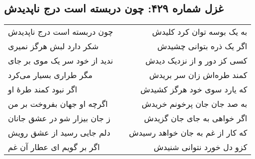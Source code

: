\begin{center}
\section*{غزل شماره ۴۲۹: چون دربسته است درج ناپدیدش}
\label{sec:429}
\begin{longtable}{l p{0.5cm} r}
چون دربسته است درج ناپدیدش
&&
به یک بوسه توان کرد کلیدش
\\
شکر دارد لبش هرگز نمیری
&&
اگر یک ذره بتوانی چشیدش
\\
ندید از خود سر یک موی بر جای
&&
کسی کز دور و از نزدیک دیدش
\\
مگر طراری بسیار می‌کرد
&&
کمند طره‌اش زان سر بریدش
\\
اگر نبود کمند طرهٔ او
&&
که یارد سوی خود هرگز کشیدش
\\
اگرچه او جهان بفروخت بر من
&&
به صد جان جان پرخونم خریدش
\\
ز جان بیزار شو در عشق جانان
&&
اگر خواهی به جای جان گزیدش
\\
دلم جایی رسید از عشق رویش
&&
که کار از غم به جان خواهد رسیدش
\\
اگر بر گویم ای عطار آن غم
&&
کزو دل خورد نتوانی شنیدش
\\
\end{longtable}
\end{center}
